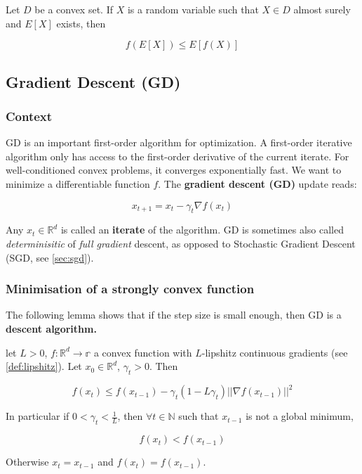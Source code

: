 \documentclass[
10pt, %
a4paper, %
oneside, %
headinclude,footinclude, %
BCOR5mm, %
]{scrartcl}
\begin{document}
Let $D$ be a convex set. If $X$ is a random variable such that $ X\in D$ almost surely and $ E[X]$ exists, then

\begin{equation*}
    f(E[X])\leq E[f(X)]
\end{equation*}

\subsection{\large\color{MidnightBlue}Gradient Descent (GD)}

\subsubsection{\large\color{Periwinkle}Context}

GD is an important first-order algorithm for optimization. A first-order iterative algorithm only has access to the first-order derivative of the current iterate. For well-conditioned convex problems, it converges exponentially fast. We want to minimize a differentiable function $f$. The \textbf{{gradient descent (GD)}}  update reads:

\begin{equation*}
    x_{t+1} = x_t - \gamma_t \nabla f(x_t)
\end{equation*}


Any $x_t\in \mathbb{R}^d$ is called an \textbf{{iterate}} of the algorithm. GD is sometimes also called \textit{{determinisitic}} of \textit{{full
gradient}} descent, as opposed to Stochastic Gradient Descent (SGD, see \ref{sec:sgd}).

\subsubsection{\large\color{Periwinkle}Minimisation of a strongly convex function}

The following lemma shows that if the step size is small enough, then GD is a \textbf{{descent algorithm.}} 

\begin{lemma}
    let $L>0$, $f: \mathbb{R}^d\rightarrow \mathbb{r} $ a convex function with $L$-lipshitz continuous gradients (see \ref{def:lipshitz}). Let $x_0\in \mathbb{R}^d$, $\gamma_t >0$. Then

    \begin{equation*}
	f(x_t)\leq f(x_{t-1})-\gamma_t (1-L\gamma_t) ||\nabla f(x_{t-1})||^2
    \end{equation*}

    In particular if $0<  \gamma_t < \frac{1}{L} $, then $ \forall t\in \mathbb{N} $ such that $ x_{t-1}$ is not a global minimum,

    \begin{equation*}
	f(x_t)<f(x_{t-1})
    \end{equation*}

    Otherwise $x_t = x_{t-1}$ and $f(x_t) = f(x_{t-1})$.
\end{lemma}
\end{document}
